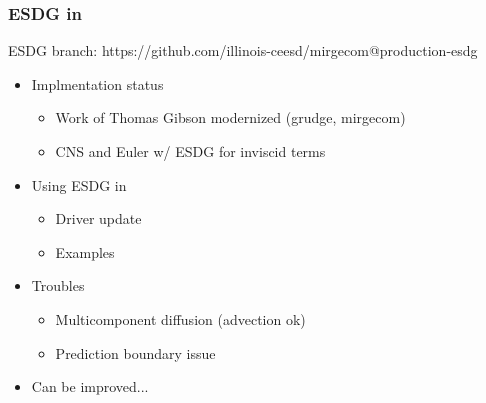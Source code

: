 \def\CC{{C\nolinebreak[4]\hspace{-.05em}\raisebox{.4ex}{\tiny\bf ++}}}
%
\begin{frame}\frametitle{ESDG in \mirgecom{}}
\vspace{15pt}
\begin{center}
\mirgecom{} ESDG branch: https://github.com/illinois-ceesd/mirgecom@production-esdg
\end{center}
\begin{itemize}
\item Implmentation status
\begin{itemize}
\item Work of Thomas Gibson modernized (grudge, mirgecom)
\item CNS and Euler w/ ESDG for inviscid terms
\end{itemize}
\item Using ESDG in \mirgecom{}
\begin{itemize}
\item Driver update
\item Examples
\end{itemize}
\item Troubles
\begin{itemize}
\item Multicomponent diffusion (advection ok)
\item Prediction boundary issue
\end{itemize}
\item Can be improved...
\end{itemize}
\end{frame}

